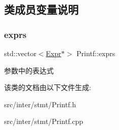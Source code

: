 \subsection{类成员变量说明}
\mbox{\label{class_printf_ab07a181eb9cd79c9018e172332d44ce5}} 
\subsubsection{\texorpdfstring{exprs}{exprs}}
{\footnotesize\ttfamily std\+::vector$<$\hyperlink{class_expr}{Expr}$\ast$$>$ Printf\+::exprs}

参数中的表达式 

该类的文档由以下文件生成\+:\begin{DoxyCompactItemize}
\item 
src/inter/stmt/Printf.\+h\item 
src/inter/stmt/Printf.\+cpp\end{DoxyCompactItemize}
